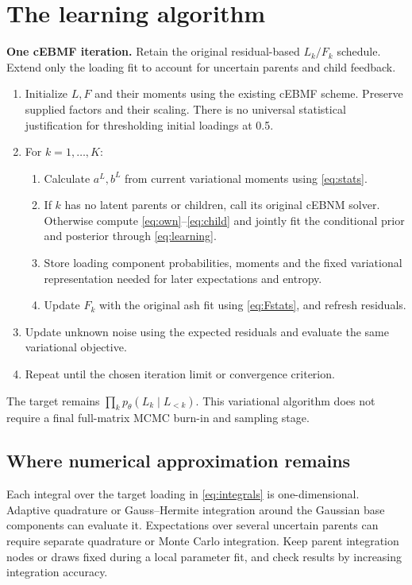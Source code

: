\documentclass[11pt,a4paper]{article}
\newcommand{\note}[1]{\par\smallskip\noindent\colorbox{blue!5}{\parbox{\dimexpr\linewidth-2\fboxsep\relax}{#1}}\par\smallskip}
\begin{document}
\section{The learning algorithm}
\note{\textbf{One cEBMF iteration.}
Retain the original residual-based \(L_k/F_k\) schedule. Extend only the loading
fit to account for uncertain parents and child feedback.}
\begin{enumerate}
\item Initialize \(L,F\) and their moments using the existing cEBMF scheme.
Preserve supplied factors and their scaling. There is no universal
statistical justification for thresholding initial loadings at 0.5.
\item For \(k=1,\ldots,K\):
  \begin{enumerate}[label=(\alph*)]
  \item Calculate \(a^L,b^L\) from current variational moments using
  \eqref{eq:stats}.
  \item If \(k\) has no latent parents or children, call its original cEBNM
  solver. Otherwise compute \eqref{eq:own}--\eqref{eq:child} and jointly
  fit the conditional prior and posterior through \eqref{eq:learning}.
  \item Store loading component probabilities, moments and the fixed
  variational representation needed for later expectations and entropy.
  \item Update \(F_k\) with the original ash fit using \eqref{eq:Fstats}, and
  refresh residuals.
  \end{enumerate}
\item Update unknown noise using the expected residuals and evaluate the
same variational objective.
\item Repeat until the chosen iteration limit or convergence criterion.
\end{enumerate}
The target remains \(\prod_kp_\theta(L_k\mid L_{<k})\). This variational
algorithm does not require a final full-matrix MCMC burn-in and sampling stage.

\subsection{Where numerical approximation remains}
Each integral over the target loading in \eqref{eq:integrals} is
one-dimensional. Adaptive quadrature or Gauss--Hermite integration around
the Gaussian base components can evaluate it. Expectations over several
uncertain parents can require separate quadrature or Monte Carlo integration.
Keep parent integration nodes or draws fixed during a local parameter fit,
and check results by increasing integration accuracy.
\end{document}
